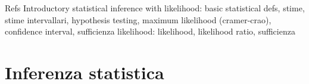 \begin{frame}{Refs}
Introductory statistical inference with likelihood: basic statistical defs, stime, stime intervallari, hypothesis testing, maximum likelihood (cramer-crao), confidence interval, sufficienza 
likelihood: likelihood, likelihood ratio, sufficienza
\end{frame}

\section{Inferenza statistica}
